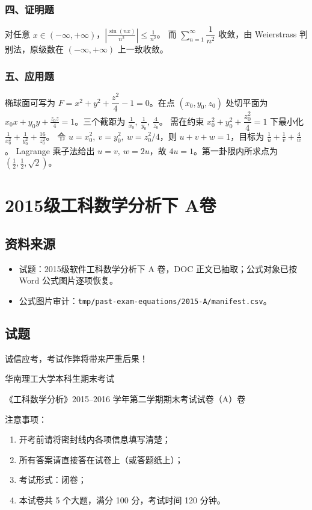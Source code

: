 \subsubsection*{四、证明题}
对任意 $x\in(-\infty,+\infty)$，\(\displaystyle \left|\frac{\sin(nx)}{n^2}\right|\le\frac1{n^2}\)。
而 $\sum_{n=1}^{\infty}\dfrac1{n^2}$ 收敛，由 Weierstrass 判别法，原级数在 $(-\infty,+\infty)$ 上一致收敛。

\subsubsection*{五、应用题}
椭球面可写为 $F=x^2+y^2+\dfrac{z^2}{4}-1=0$。在点 $(x_0,y_0,z_0)$ 处切平面为
\(\displaystyle x_0x+y_0y+\frac{z_0z}{4}=1\)。三个截距为 \(\displaystyle \frac1{x_0},\ \frac1{y_0},\ \frac4{z_0}\)。
需在约束 $x_0^2+y_0^2+\dfrac{z_0^2}{4}=1$ 下最小化
\(\displaystyle \frac1{x_0^2}+\frac1{y_0^2}+\frac{16}{z_0^2}\)。
令 $u=x_0^2,\ v=y_0^2,\ w=z_0^2/4$，则 $u+v+w=1$，目标为
\(\displaystyle \frac1u+\frac1v+\frac4w\)。
Lagrange 乘子法给出 $u=v,\ w=2u$，故 $4u=1$。第一卦限内所求点为
\(\displaystyle \left(\frac12,\frac12,\sqrt2\right)\)。

\section{2015级工科数学分析下 A卷}

\subsection{资料来源}
\begin{itemize}
  \item 试题：2015级软件工科数学分析下 A 卷，DOC 正文已抽取；公式对象已按 Word 公式图片逐项恢复。
  \item 公式图片审计：\texttt{tmp/past-exam-equations/2015-A/manifest.csv}。
\end{itemize}

\subsection{试题}
诚信应考，考试作弊将带来严重后果！

华南理工大学本科生期末考试

《工科数学分析》2015--2016 学年第二学期期末考试试卷（A）卷

注意事项：
\begin{enumerate}
  \item 开考前请将密封线内各项信息填写清楚；
  \item 所有答案请直接答在试卷上（或答题纸上）；
  \item 考试形式：闭卷；
  \item 本试卷共 5 个大题，满分 100 分，考试时间 120 分钟。
\end{enumerate}

